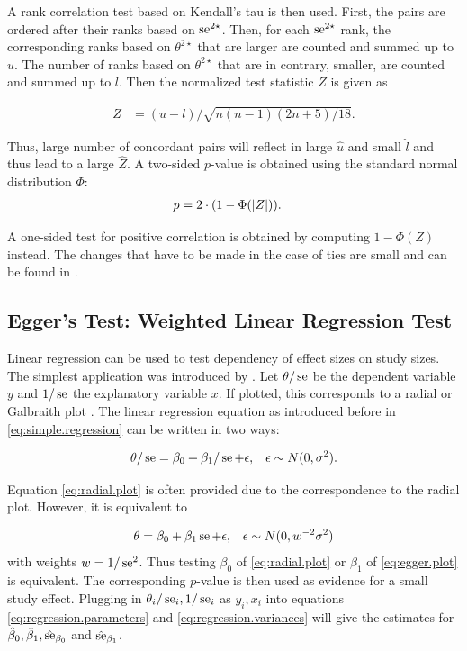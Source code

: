 \documentclass[11pt,a4paper,twoside]{book}\usepackage[]{graphicx}\usepackage[]{color}
\begin{document}
A rank correlation test based on Kendall's tau is then used. First, the pairs are ordered after their ranks based on $\operatorname{se}^{2\star}$. Then, for each $\operatorname{se}^{2\star}$ rank, the corresponding ranks based on $\theta^{2\star}$ that are larger are counted and summed up to $u$. The number of ranks based on $\theta^{2\star}$ that are in contrary, smaller, are counted and summed up to $l$. Then the normalized test statistic $Z$ is given as

\begin{align}
Z &= (u - l)/\sqrt{n(n-1)(2n + 5)/18}. \nonumber
\end{align}

Thus, large number of concordant pairs will reflect in large $\hat{u}$ and small $\hat{l}$ and thus lead to a large $\hat{Z}$. A two-sided  $p$\hspace{0.4mm}-value is obtained using the standard normal distribution $\Phi$:
\begin{align}
p &= 2\cdot(1-\Phi(\left\lvert Z\right\rvert)). \nonumber
\end{align}

A one-sided test for positive correlation is obtained by computing $1-\Phi(Z)$ instead.
The changes that have to be made in the case of ties are small and can be found in \citet{begg.ties}.


\subsection{Egger's Test: Weighted Linear Regression Test} \label{sec:Egger}
Linear regression can be used to test dependency of effect sizes on study sizes. The simplest application was introduced by \citet{Egger}.
Let $\theta/\operatorname{se}$ be the dependent variable $y$ and $1/\operatorname{se}$ the explanatory variable $x$. If plotted, this corresponds to a radial or Galbraith plot \citep{galbraith}. The linear regression equation as introduced before in \eqref{eq:simple.regression} can be written in two ways:

\begin{align}
\theta/\operatorname{se} &= \beta_0 + \beta_1/\operatorname{se} + \epsilon, & \epsilon \sim N(0, \sigma^2). \label{eq:radial.plot} 
\end{align}

Equation \eqref{eq:radial.plot} is often provided due to the correspondence to the radial plot. However, it is equivalent to

\begin{align}
\theta &= \beta_0 + \beta_1 \operatorname{se} + \epsilon, & \epsilon \sim N(0, w^{-2}\sigma^2) \label{eq:egger.plot}
\end{align}
with weights $w = 1/\operatorname{se}^2$. Thus testing $\beta_0$ of \eqref{eq:radial.plot} or $\beta_1$ of \eqref{eq:egger.plot} is equivalent. The corresponding  $p$\hspace{0.4mm}-value is then used as evidence for a small study effect. Plugging in  $\theta_i/\operatorname{se}_i, 1/\operatorname{se}_i$ as $y_i, x_i$ into equations \eqref{eq:regression.parameters} and \eqref{eq:regression.variances} will give the estimates for $\hat{\beta}_0, \hat{\beta}_1,\hat{\operatorname{se}}_{\beta_0}$ and $\hat{\operatorname{se}}_{\beta_1}$.
\end{document}
